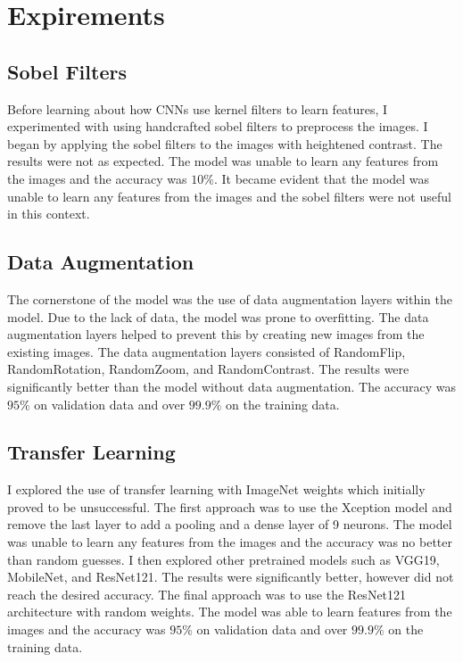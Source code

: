 \documentclass[conference]{IEEEtran}
\begin{document}
\section{Expirements}

\subsection{Sobel Filters}
Before learning about how CNNs use kernel filters to learn features, I experimented with using handcrafted sobel filters to preprocess the images. I began by applying the sobel filters to the images with heightened contrast. The results were not as expected. The model was unable to learn any features from the images and the accuracy was $10\%$. It became evident that the model was unable to learn any features from the images and the sobel filters were not useful in this context.

\subsection{Data Augmentation}
The cornerstone of the model was the use of data augmentation layers within the model. Due to the lack of data, the model was prone to overfitting. The data augmentation layers helped to prevent this by creating new images from the existing images. The data augmentation layers consisted of RandomFlip, RandomRotation, RandomZoom, and RandomContrast. The results were significantly better than the model without data augmentation. The accuracy was $95\%$ on validation data and over $99.9\%$ on the training data.

\subsection{Transfer Learning}
I explored the use of transfer learning with ImageNet weights which initially proved to be unsuccessful. The first approach was to use the Xception model and remove the last layer to add a pooling and a dense layer of 9 neurons. The model was unable to learn any features from the images and the accuracy was no better than random guesses. I then explored other pretrained models such as VGG19, MobileNet, and ResNet121. The results were significantly better, however did not reach the desired accuracy. The final approach was to use the ResNet121 architecture with random weights. The model was able to learn features from the images and the accuracy was $95\%$ on validation data and over $99.9\%$ on the training data.
\end{document}
